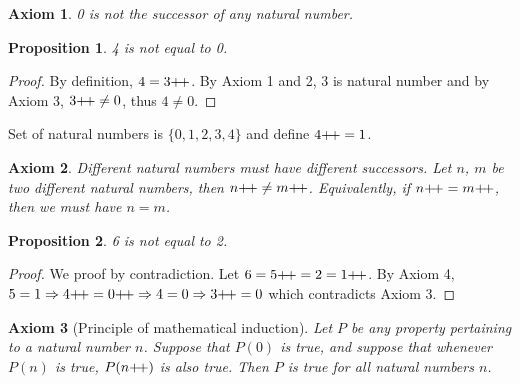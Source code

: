 \documentclass[12pt]{article}
\newtheorem{axiom}{Axiom}
\newtheorem{proposition}{Proposition}[section]
\theoremstyle{remark}
\begin{document}
\begin{axiom}
    0 is not the successor of any natural number.
\end{axiom}

\begin{proposition}
	4 is not equal to 0.  
\end{proposition}

\begin{proof}
    By definition, $4 = 3\inc$. By Axiom 1 and 2, 3 is natural number and by Axiom 3, $3\inc \neq 0$, thus $4 \neq 0$.
\end{proof}

\begin{cexample}
	Set of natural numbers is $\{0, 1, 2, 3, 4\}$ and define $4\inc = 1$.
\end{cexample}

\begin{axiom}
	Different natural numbers must have different successors. Let $n$, $m$ be two different natural numbers, then $n\inc \neq m\inc$. Equivalently, if $n\inc = m\inc$, then we must have $n=m$.
\end{axiom}

\begin{proposition}
    6 is not equal to 2.
\end{proposition}

\begin{proof}
    We proof by contradiction. Let $6 = 5\inc = 2 = 1\inc $. By Axiom 4, $5 = 1 \Rightarrow 4\inc = 0\inc \Rightarrow 4 = 0 \Rightarrow 3\inc = 0$ which contradicts Axiom 3.
\end{proof}

\begin{axiom}[Principle of mathematical induction]
	Let $P$ be any property pertaining to a natural number $n$. Suppose that $P(0)$ is true, and suppose that whenever $P(n)$ is true, $P(n\inc)$ is also true. Then $P$ is true for all natural numbers $n$. 
\end{axiom}
\end{document}
